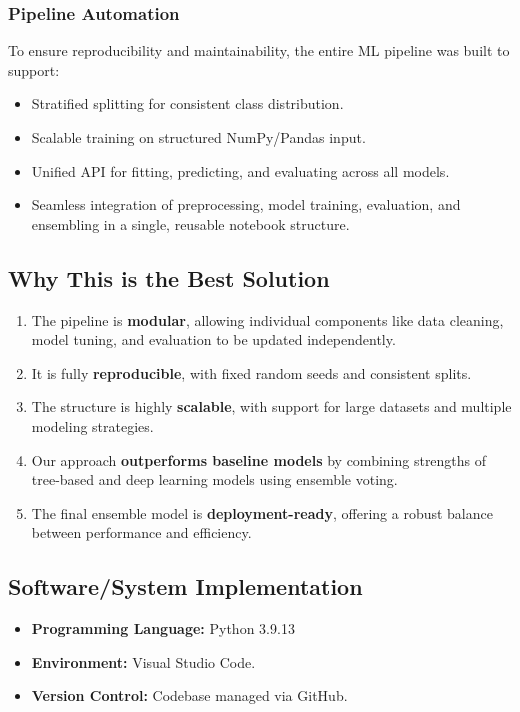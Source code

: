 \documentclass{article} %
\begin{document}
\subsubsection*{Pipeline Automation}

To ensure reproducibility and maintainability, the entire ML pipeline was built to support:

\begin{itemize}
    \item Stratified splitting for consistent class distribution.
    \item Scalable training on structured NumPy/Pandas input.
    \item Unified API for fitting, predicting, and evaluating across all models.
    \item Seamless integration of preprocessing, model training, evaluation, and ensembling in a single, reusable notebook structure.
\end{itemize}

\subsection*{Why This is the Best Solution}

\begin{enumerate}
    \setcounter{enumi}{0}
    \item The pipeline is \textbf{modular}, allowing individual components like data cleaning, model tuning, and evaluation to be updated independently.
    \item It is fully \textbf{reproducible}, with fixed random seeds and consistent splits.
    \item The structure is highly \textbf{scalable}, with support for large datasets and multiple modeling strategies.
    \item Our approach \textbf{outperforms baseline models} by combining strengths of tree-based and deep learning models using ensemble voting.
    \item The final ensemble model is \textbf{deployment-ready}, offering a robust balance between performance and efficiency.
\end{enumerate}


\subsection*{Software/System Implementation}

\begin{itemize}
    \item \textbf{Programming Language:} Python 3.9.13
    \item \textbf{Environment:} Visual Studio Code.
    \item \textbf{Version Control:} Codebase managed via GitHub.
\end{itemize}
\end{document}
